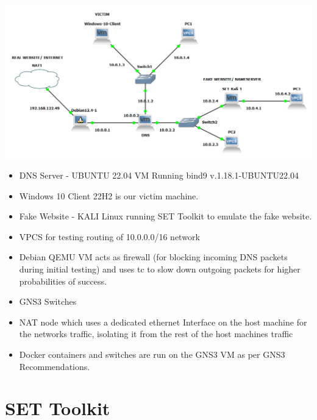\documentclass[11pt]{report}
\begin{document}
\includegraphics[width=15cm]{Figures/gns3.png}
\begin{itemize}
  \item DNS Server - UBUNTU 22.04 VM Running bind9 v.1.18.1-UBUNTU22.04 
  \item Windows 10 Client 22H2 is our victim machine. 
  \item Fake Website - KALI Linux running SET Toolkit to emulate the fake website. 
  \item VPCS for testing routing of 10.0.0.0/16 network 
  \item Debian QEMU VM acts as firewall (for blocking incoming DNS packets during initial testing) and uses tc to slow down outgoing packets for higher probabilities of success. 
  \item GNS3 Switches 
  \item NAT node which uses a dedicated ethernet Interface on the host machine for the networks traffic, isolating it from the rest of the host machines traffic 
  \item Docker containers and switches are run on the GNS3 VM as per GNS3 Recommendations. 
\end{itemize}

\section*{SET Toolkit}
\end{document}
